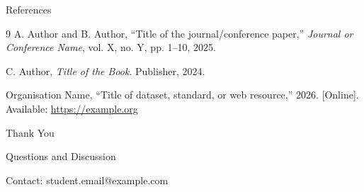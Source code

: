 \documentclass[aspectratio=169,11pt]{beamer}
\begin{document}
\begin{frame}[allowframebreaks]{References}
  \footnotesize
  \begin{thebibliography}{9}
      A. Author and B. Author,
      ``Title of the journal/conference paper,''
      \emph{Journal or Conference Name}, vol. X, no. Y, pp. 1--10, 2025.

      C. Author,
      \emph{Title of the Book}.
      Publisher, 2024.

      Organisation Name,
      ``Title of dataset, standard, or web resource,'' 2026.
      [Online]. Available: \url{https://example.org}
  \end{thebibliography}
\end{frame}

\begin{frame}[plain]
  \centering
  \vfill
  {\color{UniversityBlue}\Huge Thank You}\par
  \vspace{0.5cm}
  {\Large Questions and Discussion}\par
  \vspace{0.8cm}
  {\normalsize Contact: student.email@example.com}
  \vfill
\end{frame}
\end{document}
